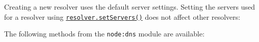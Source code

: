 Creating a new resolver uses the default server settings. Setting the
servers used for a resolver using
\hyperref[dnssetserversservers]{\texttt{resolver.setServers()}} does not
affect other resolvers:

\begin{Shaded}
\begin{Highlighting}[]
\OperatorTok{=} \NormalTok{(}\NormalTok{)}\OperatorTok{;}
\OperatorTok{=}  \NormalTok{()}\OperatorTok{;}
\NormalTok{([}\NormalTok{])}\OperatorTok{;}

\NormalTok{(}\OperatorTok{,}\OperatorTok{,}\KeywordTok{=\textgreater{}}\NormalTok{ \{}
\NormalTok{\})}\OperatorTok{;}
\end{Highlighting}
\end{Shaded}

The following methods from the \texttt{node:dns} module are available:

